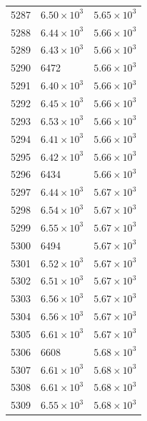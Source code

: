 \begin{table}[H]
\begin{tabular}{lll}
5287 & $\displaystyle 6.50 \times 10^{3}$ & $\displaystyle 5.65 \times 10^{3}$ \\
5288 & $\displaystyle 6.44 \times 10^{3}$ & $\displaystyle 5.66 \times 10^{3}$ \\
5289 & $\displaystyle 6.43 \times 10^{3}$ & $\displaystyle 5.66 \times 10^{3}$ \\
5290 & 6472 & $\displaystyle 5.66 \times 10^{3}$ \\
5291 & $\displaystyle 6.40 \times 10^{3}$ & $\displaystyle 5.66 \times 10^{3}$ \\
5292 & $\displaystyle 6.45 \times 10^{3}$ & $\displaystyle 5.66 \times 10^{3}$ \\
5293 & $\displaystyle 6.53 \times 10^{3}$ & $\displaystyle 5.66 \times 10^{3}$ \\
5294 & $\displaystyle 6.41 \times 10^{3}$ & $\displaystyle 5.66 \times 10^{3}$ \\
5295 & $\displaystyle 6.42 \times 10^{3}$ & $\displaystyle 5.66 \times 10^{3}$ \\
5296 & 6434 & $\displaystyle 5.66 \times 10^{3}$ \\
5297 & $\displaystyle 6.44 \times 10^{3}$ & $\displaystyle 5.67 \times 10^{3}$ \\
5298 & $\displaystyle 6.54 \times 10^{3}$ & $\displaystyle 5.67 \times 10^{3}$ \\
5299 & $\displaystyle 6.55 \times 10^{3}$ & $\displaystyle 5.67 \times 10^{3}$ \\
5300 & 6494 & $\displaystyle 5.67 \times 10^{3}$ \\
5301 & $\displaystyle 6.52 \times 10^{3}$ & $\displaystyle 5.67 \times 10^{3}$ \\
5302 & $\displaystyle 6.51 \times 10^{3}$ & $\displaystyle 5.67 \times 10^{3}$ \\
5303 & $\displaystyle 6.56 \times 10^{3}$ & $\displaystyle 5.67 \times 10^{3}$ \\
5304 & $\displaystyle 6.56 \times 10^{3}$ & $\displaystyle 5.67 \times 10^{3}$ \\
5305 & $\displaystyle 6.61 \times 10^{3}$ & $\displaystyle 5.67 \times 10^{3}$ \\
5306 & 6608 & $\displaystyle 5.68 \times 10^{3}$ \\
5307 & $\displaystyle 6.61 \times 10^{3}$ & $\displaystyle 5.68 \times 10^{3}$ \\
5308 & $\displaystyle 6.61 \times 10^{3}$ & $\displaystyle 5.68 \times 10^{3}$ \\
5309 & $\displaystyle 6.55 \times 10^{3}$ & $\displaystyle 5.68 \times 10^{3}$ \\

\end{tabular}
\end{table}
